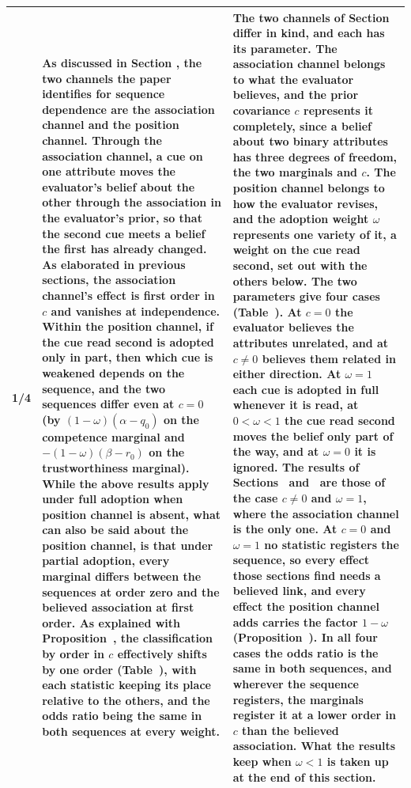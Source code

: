\documentclass[10pt]{article}
\theoremstyle{definition}
\renewcommand{\ref}[1]{\textsc{\detokenize{#1}}}
\begin{document}
{\begin{longtable}{|p{0.9cm}|p{12.2cm}|p{12.2cm}|}
1/4 & As discussed in Section \ref{sec:intro}, the two channels the paper identifies for sequence dependence are the association channel and the position channel. Through the association channel, a cue on one attribute moves the evaluator's belief about the other through the association in the evaluator's prior, so that the second cue meets a belief the first has already changed. As elaborated in previous sections, the association channel's effect is first order in $c$ and vanishes at independence. Within the position channel, if the cue read second is adopted only in part, then which cue is weakened depends on the sequence, and the two sequences differ even at $c=0$ (by $(1-\omega)(\alpha-q_0)$ on the competence marginal and $-(1-\omega)(\beta-r_0)$ on the trustworthiness marginal). While the above results apply under full adoption when position channel is absent, what can also be said about the position channel, is that under partial adoption, every marginal differs between the sequences at order zero and the believed association at first order. As explained with Proposition~\ref{prop:LAD}, the classification by order in $c$ effectively shifts by one order (Table~\ref{tab:robust}), with each statistic keeping its place relative to the others, and the odds ratio being the same in both sequences at every weight. & The two channels of Section~\ref{sec:intro} differ in kind, and each has its parameter. The association channel belongs to what the evaluator believes, and the prior covariance $c$ represents it completely, since a belief about two binary attributes has three degrees of freedom, the two marginals and $c$. The position channel belongs to how the evaluator revises, and the adoption weight $\omega$ represents one variety of it, a weight on the cue read second, set out with the others below. The two parameters give four cases (Table~\ref{tab:cases}). At $c=0$ the evaluator believes the attributes unrelated, and at $c\neq0$ believes them related in either direction. At $\omega=1$ each cue is adopted in full whenever it is read, at $0<\omega<1$ the cue read second moves the belief only part of the way, and at $\omega=0$ it is ignored. The results of Sections~\ref{sec:individual} and~\ref{sec:aggregation} are those of the case $c\neq0$ and $\omega=1$, where the association channel is the only one. At $c=0$ and $\omega=1$ no statistic registers the sequence, so every effect those sections find needs a believed link, and every effect the position channel adds carries the factor $1-\omega$ (Proposition~\ref{prop:LAD}). In all four cases the odds ratio is the same in both sequences, and wherever the sequence registers, the marginals register it at a lower order in $c$ than the believed association. What the results keep when $\omega<1$ is taken up at the end of this section. \\ \hline

\end{longtable}}
\end{document}
